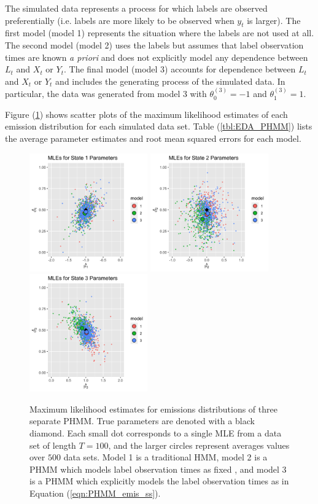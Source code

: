 The simulated data represents a process for which labels are observed preferentially (i.e. labels are more likely to be observed when $y_t$ is larger). The first model (model 1) represents the situation where the labels are not used at all. The second model (model 2) uses the labels but assumes that label observation times are known \textit{a priori} and does not explicitly model any dependence between $L_t$ and $X_t$ or $Y_t$. The final model (model 3) accounts for dependence between $L_t$ and $X_t$ or $Y_t$ and includes the generating process of the simulated data. In particular, the data was generated from model 3 with $\theta^{(3)}_0 = -1$ and $\theta^{(3)}_1 = 1$.

Figure (\ref{fig:EDA_PHMM}) shows scatter plots of the maximum likelihood estimates of each emission distribution for each simulated data set. Table (\ref{tbl:EDA_PHMM}) lists the average parameter estimates and root mean squared errors for each model.
%
\begin{figure}
    \centering
    \includegraphics[width=2in]{../plt/state_1.png}
    \includegraphics[width=2in]{../plt/state_2.png}
    \includegraphics[width=2in]{../plt/state_3.png}
    \caption{Maximum likelihood estimates for emissions distributions of three separate PHMM. True parameters are denoted with a black diamond. Each small dot corresponds to a single MLE from a data set of length $T=100$, and the larger circles represent averages values over $500$ data sets. Model 1 is a traditional HMM, model 2 is a PHMM which models label observation times as fixed \citep{McClintock:2018}, and model 3 is a PHMM which explicitly models the label observation times as in Equation (\ref{eqn:PHMM_emis_ss}).}
    \label{fig:EDA_PHMM}
\end{figure}
